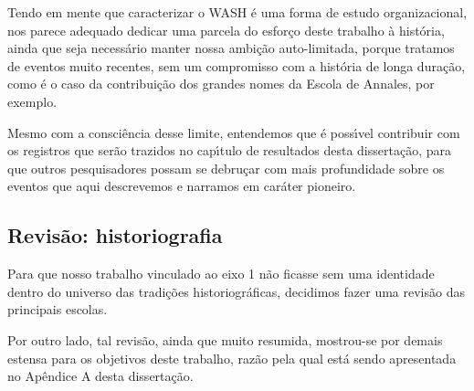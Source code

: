 \documentclass[
12pt,		%
openright,	%
twoside,  %
a4paper,			%
chapter=TITLE,		%
english,			%
french,				%
spanish,			%
brazil				%
]{USPSC-classe/USPSC}
\begin{document}
Tendo em mente que caracterizar o WASH \'e uma forma de estudo organizacional, nos parece adequado dedicar uma parcela do esfor\c{c}o deste trabalho \`a hist\'oria, ainda que seja necess\'ario manter nossa ambi\c{c}\~ao auto-limitada, porque tratamos de eventos muito recentes, sem um compromisso com a hist\'oria de longa dura\c{c}\~ao, como \'e o caso da contribui\c{c}\~ao dos grandes nomes da Escola de Annales, por exemplo.

















Mesmo com a consci\^encia desse limite, entendemos que \'e poss\'{\i}vel contribuir com os registros que ser\~ao trazidos no cap\'{\i}tulo de resultados desta disserta\c{c}\~ao, para que outros pesquisadores possam se debru\c{c}ar com mais profundidade sobre os eventos que aqui descrevemos e narramos em car\'ater pioneiro.

















\subsection[Revis\~ao: historiografia]{Revis\~ao: historiografia}\label{Revis\~ao: historiografia}
Para que nosso trabalho vinculado ao eixo 1 n\~ao ficasse sem uma identidade dentro do universo das tradi\c{c}\~oes historiogr\'aficas, decidimos fazer uma revis\~ao das principais escolas.

















Por outro lado, tal revis\~ao, ainda que muito resumida, mostrou-se por demais estensa para os objetivos deste trabalho, raz\~ao pela qual est\'a sendo apresentada no Ap\^endice A desta disserta\c{c}\~ao.
\end{document}
